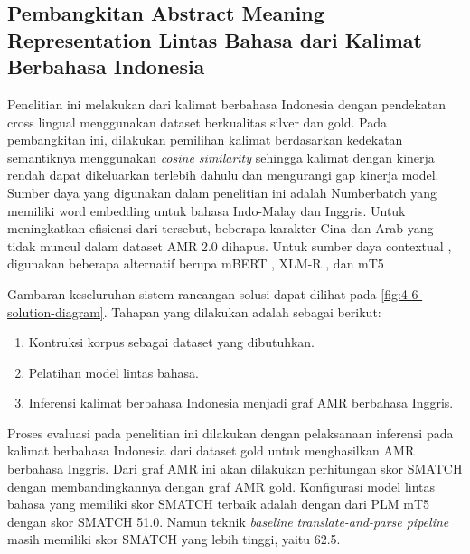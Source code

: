 \subsection{Pembangkitan Abstract Meaning Representation Lintas Bahasa dari Kalimat Berbahasa Indonesia }

Penelitian ini melakukan \amrparsing{} dari kalimat berbahasa Indonesia dengan pendekatan cross lingual menggunakan dataset berkualitas silver dan gold.
Pada pembangkitan ini, dilakukan pemilihan kalimat berdasarkan kedekatan semantiknya menggunakan \textit{cosine similarity} sehingga kalimat dengan kinerja rendah dapat dikeluarkan terlebih dahulu dan mengurangi gap kinerja model.
Sumber daya yang digunakan dalam penelitian ini adalah \mwordem{} Numberbatch yang memiliki word embedding untuk bahasa Indo-Malay dan Inggris.
Untuk meningkatkan efisiensi dari \wordem{} tersebut, beberapa karakter Cina dan Arab yang tidak muncul dalam dataset AMR 2.0 dihapus.
Untuk sumber daya contextual \mwordem{}, digunakan beberapa alternatif berupa mBERT , XLM-R , dan mT5 .

Gambaran keseluruhan sistem rancangan solusi dapat dilihat pada \cref{fig:4-6-solution-diagram}.
Tahapan yang dilakukan adalah sebagai berikut:
\begin{enumerate}
  \item Kontruksi korpus sebagai dataset yang dibutuhkan.
  \item Pelatihan model \amrparsing{} lintas bahasa.
  \item Inferensi kalimat berbahasa Indonesia menjadi graf \gls{AMR} berbahasa Inggris.
\end{enumerate}


Proses evaluasi pada penelitian ini dilakukan dengan pelaksanaan inferensi pada kalimat berbahasa Indonesia dari dataset gold untuk menghasilkan \gls{AMR} berbahasa Inggris.
Dari graf \gls{AMR} ini akan dilakukan perhitungan skor \gls{SMATCH} dengan membandingkannya dengan graf \gls{AMR} gold.
Konfigurasi model \amrparsing{} lintas bahasa yang memiliki skor \gls{SMATCH} terbaik adalah dengan \mwordem{} dari \gls{PLM} mT5 dengan skor \gls{SMATCH} 51.0.
Namun teknik \textit{baseline} \textit{translate-and-parse pipeline} masih memiliki skor \gls{SMATCH} yang lebih tinggi, yaitu 62.5.
